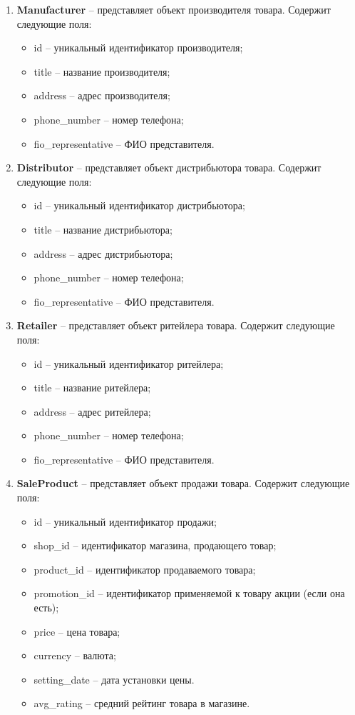 \begin{enumerate}
	\item \textbf{Manufacturer} -- представляет объект производителя товара. Содержит следующие поля: 
	\begin{itemize}
		\item id -- уникальный идентификатор производителя;
		\item title -- название производителя;
		\item address -- адрес производителя;
		\item phone\_number -- номер телефона;
		\item fio\_representative -- ФИО представителя.
	\end{itemize}
	
	\item \textbf{Distributor} -- представляет объект дистрибьютора товара. Содержит следующие поля: 
	\begin{itemize}
		\item id -- уникальный идентификатор дистрибьютора;
		\item title -- название дистрибьютора;
		\item address -- адрес дистрибьютора;
		\item phone\_number -- номер телефона;
		\item fio\_representative -- ФИО представителя.
	\end{itemize}
	
	\item \textbf{Retailer} -- представляет объект ритейлера товара. Содержит следующие поля: 
	\begin{itemize}
		\item id -- уникальный идентификатор ритейлера;
		\item title -- название ритейлера;
		\item address -- адрес ритейлера;
		\item phone\_number -- номер телефона;
		\item fio\_representative -- ФИО представителя.
	\end{itemize}
	
	\item \textbf{SaleProduct} -- представляет объект продажи товара. Содержит следующие поля: 
	\begin{itemize}
		\item id -- уникальный идентификатор продажи;
		\item shop\_id -- идентификатор магазина, продающего товар;
		\item product\_id -- идентификатор продаваемого товара;
		\item promotion\_id -- идентификатор применяемой к товару акции (если она есть);
		\item price -- цена товара;
		\item currency -- валюта;
		\item setting\_date -- дата установки цены.
		\item avg\_rating -- средний рейтинг товара в магазине.
	\end{itemize}
	

\end{enumerate}
